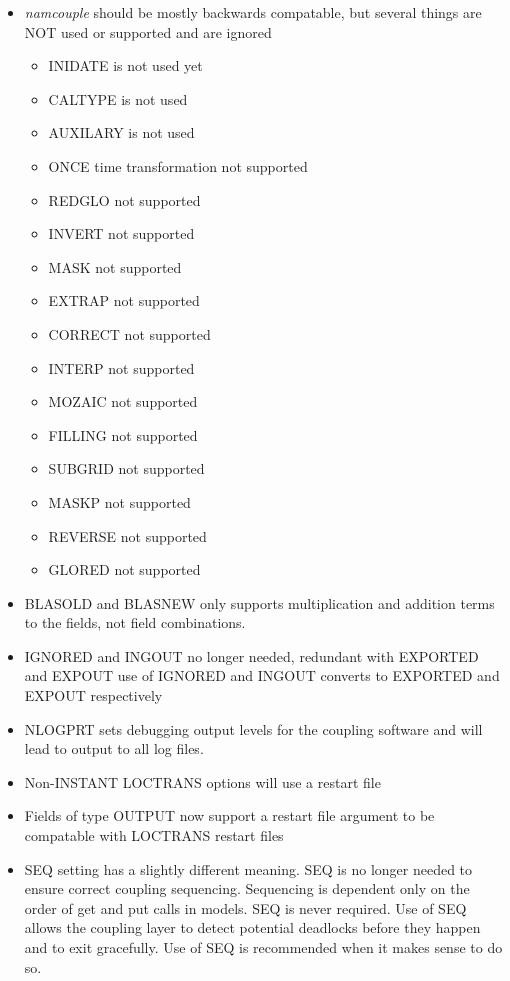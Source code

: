 \begin{itemize}
\begin{itemize}
\item {\it namcouple} should be mostly backwards compatable, but several things
  are NOT used or supported and are ignored
\begin{itemize}
  \item INIDATE is not used yet
  \item CALTYPE is not used
  \item AUXILARY is not used
  \item ONCE time transformation not supported
  \item REDGLO not supported
  \item INVERT not supported
  \item MASK not supported
  \item EXTRAP not supported
  \item CORRECT not supported
  \item INTERP not supported
  \item MOZAIC not supported
  \item FILLING not supported
  \item SUBGRID not supported
  \item MASKP not supported
  \item REVERSE not supported
  \item GLORED not supported
\end{itemize}
\item BLASOLD and BLASNEW only supports multiplication and addition
  terms to the fields, not field combinations.
\item IGNORED and INGOUT no longer needed, redundant with EXPORTED and EXPOUT
  use of IGNORED and INGOUT converts to EXPORTED and EXPOUT respectively
\item NLOGPRT sets debugging output levels for the coupling software
  and will lead to output to all log files.
\item Non-INSTANT LOCTRANS options will use a restart file
\item Fields of type OUTPUT now support a restart file argument to be
  compatable with LOCTRANS restart files
\item SEQ setting has a slightly different meaning.  SEQ is no longer
  needed to ensure correct coupling sequencing.  Sequencing is dependent
  only on the order of get and put calls in models.  SEQ is never
  required.  Use of SEQ allows the coupling layer to detect
  potential deadlocks before they happen and to exit gracefully.
  Use of SEQ is recommended when it makes sense to do so.

\end{itemize}
\end{itemize}
